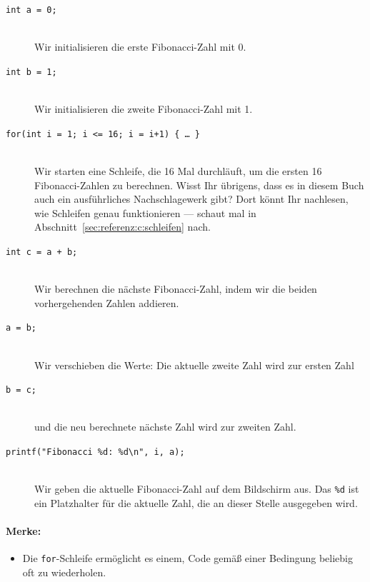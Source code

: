 \begin{description}
  \item[\texttt{int a = 0;}] \hfill\\
    Wir initialisieren die erste Fibonacci-Zahl mit 0.
  \item[\texttt{int b = 1;}] \hfill\\
    Wir initialisieren die zweite Fibonacci-Zahl mit 1.
  \item[\texttt{for(int i = 1; i <= 16; i = i+1) \{ … \} }] \hfill\\
    Wir starten eine Schleife, die 16 Mal durchläuft, um die ersten 16 Fibonacci-Zahlen zu berechnen. Wisst Ihr übrigens, dass es in diesem Buch auch ein ausführliches Nachschlagewerk gibt? Dort könnt Ihr nachlesen, wie Schleifen genau funktionieren — schaut mal in Abschnitt~\ref{sec:referenz:c:schleifen} nach.
  \item[\texttt{int c = a + b;}] \hfill\\
    Wir berechnen die nächste Fibonacci-Zahl, indem wir die beiden vorhergehenden Zahlen addieren.
  \item[\texttt{a = b;}] \hfill\\
    Wir verschieben die Werte: Die aktuelle zweite Zahl wird zur ersten Zahl
  \item[\texttt{b = c;}] \hfill\\
    und die neu berechnete nächste Zahl wird zur zweiten Zahl.
  \item[\texttt{printf("{}Fibonacci \%d: \%d\backslash n"{}, i, a);}] \hfill\\
    Wir geben die aktuelle Fibonacci-Zahl auf dem Bildschirm aus. Das \texttt{\%d} ist ein Platzhalter für die aktuelle Zahl, die an dieser Stelle ausgegeben wird. 
\end{description}

\paragraph{Merke:}

\begin{itemize}[noitemsep]
    \item Die \texttt{for}-Schleife ermöglicht es einem, Code gemäß einer Bedingung beliebig oft zu wiederholen.
\end{itemize}
